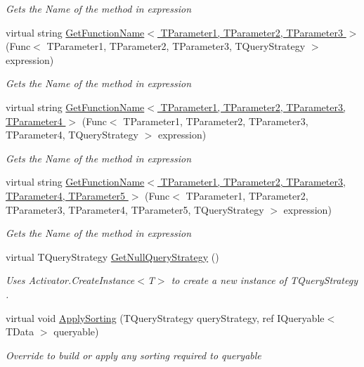 \begin{DoxyCompactItemize}
\begin{DoxyCompactList}\small\item\em Gets the Name of the method in {\itshape expression}  \end{DoxyCompactList}\item 
virtual string \hyperlink{classCqrs_1_1Repositories_1_1Queries_1_1QueryBuilder_a8fbbbe8bd1f48413c862668799987dec_a8fbbbe8bd1f48413c862668799987dec}{Get\+Function\+Name$<$ T\+Parameter1, T\+Parameter2, T\+Parameter3 $>$} (Func$<$ T\+Parameter1, T\+Parameter2, T\+Parameter3, T\+Query\+Strategy $>$ expression)
\begin{DoxyCompactList}\small\item\em Gets the Name of the method in {\itshape expression}  \end{DoxyCompactList}\item 
virtual string \hyperlink{classCqrs_1_1Repositories_1_1Queries_1_1QueryBuilder_aebcd9642f5cab863707bcfc2b4ad8b54_aebcd9642f5cab863707bcfc2b4ad8b54}{Get\+Function\+Name$<$ T\+Parameter1, T\+Parameter2, T\+Parameter3, T\+Parameter4 $>$} (Func$<$ T\+Parameter1, T\+Parameter2, T\+Parameter3, T\+Parameter4, T\+Query\+Strategy $>$ expression)
\begin{DoxyCompactList}\small\item\em Gets the Name of the method in {\itshape expression}  \end{DoxyCompactList}\item 
virtual string \hyperlink{classCqrs_1_1Repositories_1_1Queries_1_1QueryBuilder_a0228422245afb7fe388114236bb1aefa_a0228422245afb7fe388114236bb1aefa}{Get\+Function\+Name$<$ T\+Parameter1, T\+Parameter2, T\+Parameter3, T\+Parameter4, T\+Parameter5 $>$} (Func$<$ T\+Parameter1, T\+Parameter2, T\+Parameter3, T\+Parameter4, T\+Parameter5, T\+Query\+Strategy $>$ expression)
\begin{DoxyCompactList}\small\item\em Gets the Name of the method in {\itshape expression}  \end{DoxyCompactList}\item 
virtual T\+Query\+Strategy \hyperlink{classCqrs_1_1Repositories_1_1Queries_1_1QueryBuilder_a57b32d33321cbacfc7e58fec6ba3887c_a57b32d33321cbacfc7e58fec6ba3887c}{Get\+Null\+Query\+Strategy} ()
\begin{DoxyCompactList}\small\item\em Uses Activator.\+Create\+Instance$<$\+T$>$ to create a new instance of {\itshape T\+Query\+Strategy} . \end{DoxyCompactList}\item 
virtual void \hyperlink{classCqrs_1_1Repositories_1_1Queries_1_1QueryBuilder_aea4b78b2633babfaea0862f2a365c7d3_aea4b78b2633babfaea0862f2a365c7d3}{Apply\+Sorting} (T\+Query\+Strategy query\+Strategy, ref I\+Queryable$<$ T\+Data $>$ queryable)
\begin{DoxyCompactList}\small\item\em Override to build or apply any sorting required to {\itshape queryable}  \end{DoxyCompactList}\end{DoxyCompactItemize}
